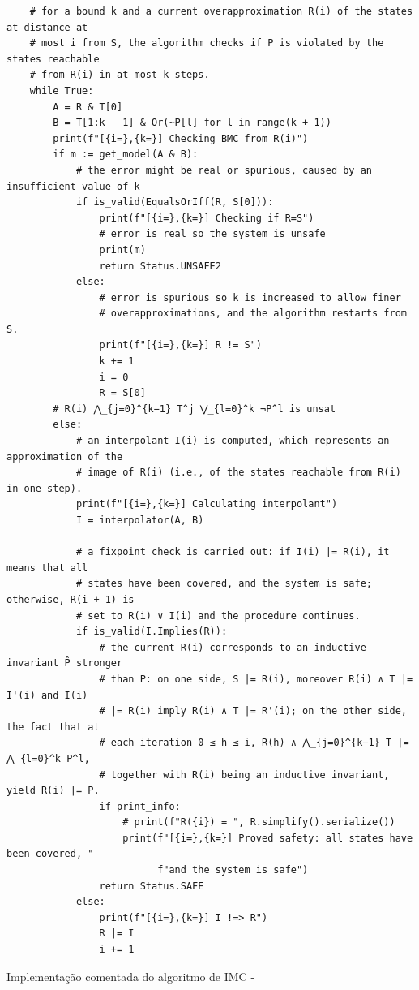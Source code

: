 \documentclass[11pt,a4paper]{report}%
\newenvironment{code}{\captionsetup{type=listing}}{}
\begin{document}
\begin{code}
\begin{verbatim}
    # for a bound k and a current overapproximation R(i) of the states at distance at
    # most i from S, the algorithm checks if P is violated by the states reachable
    # from R(i) in at most k steps.
    while True:
        A = R & T[0]
        B = T[1:k - 1] & Or(~P[l] for l in range(k + 1))
        print(f"[{i=},{k=}] Checking BMC from R(i)")
        if m := get_model(A & B):
            # the error might be real or spurious, caused by an insufficient value of k
            if is_valid(EqualsOrIff(R, S[0])):
                print(f"[{i=},{k=}] Checking if R=S")
                # error is real so the system is unsafe
                print(m)
                return Status.UNSAFE2
            else:
                # error is spurious so k is increased to allow finer
                # overapproximations, and the algorithm restarts from S.
                print(f"[{i=},{k=}] R != S")
                k += 1
                i = 0
                R = S[0]
        # R(i) ⋀_{j=0}^{k−1} T^j ⋁_{l=0}^k ¬P^l is unsat
        else:
            # an interpolant I(i) is computed, which represents an approximation of the
            # image of R(i) (i.e., of the states reachable from R(i) in one step).
            print(f"[{i=},{k=}] Calculating interpolant")
            I = interpolator(A, B)

            # a fixpoint check is carried out: if I(i) |= R(i), it means that all
            # states have been covered, and the system is safe; otherwise, R(i + 1) is
            # set to R(i) ∨ I(i) and the procedure continues.
            if is_valid(I.Implies(R)):
                # the current R(i) corresponds to an inductive invariant P̂ stronger
                # than P: on one side, S |= R(i), moreover R(i) ∧ T |= I'(i) and I(i)
                # |= R(i) imply R(i) ∧ T |= R'(i); on the other side, the fact that at
                # each iteration 0 ≤ h ≤ i, R(h) ∧ ⋀_{j=0}^{k−1} T |= ⋀_{l=0}^k P^l,
                # together with R(i) being an inductive invariant, yield R(i) |= P.
                if print_info:
                    # print(f"R({i}) = ", R.simplify().serialize())
                    print(f"[{i=},{k=}] Proved safety: all states have been covered, "
                          f"and the system is safe")
                return Status.SAFE
            else:
                print(f"[{i=},{k=}] I !=> R")
                R |= I
                i += 1
\end{verbatim}
\caption{Implementação comentada do algoritmo de IMC -\cite{interpolation_thesis}}
\label{code:imc_commented}
\end{code}
\end{document}
